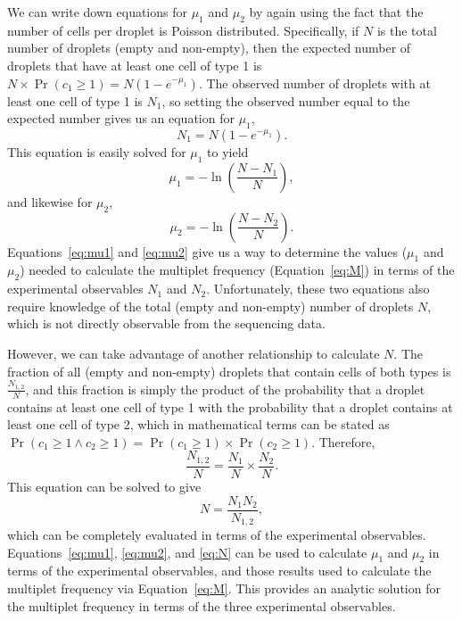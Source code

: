 \documentclass[fleqn,10pt]{wlpeerj} %
\begin{document}
We can write down equations for $\mu_1$ and $\mu_2$ by again using the fact that the number of cells per droplet is Poisson distributed.
Specifically, if $N$ is the total number of droplets (empty and non-empty), then the expected number of droplets that have at least one cell of type 1 is $N \times \Pr\left(c_1 \ge 1\right) = N \left(1 - e^{-\mu_1}\right)$.
The observed number of droplets with at least one cell of type 1 is $N_1$, so setting the observed number equal to the expected number gives us an equation for $\mu_1$,
\begin{equation}
N_1 = N \left(1 - e^{-\mu_1}\right).
\end{equation}
This equation is easily solved for $\mu_1$ to yield
\begin{equation}
\label{eq:mu1}
\mu_1 = -\ln\left(\frac{N - N_1}{N}\right),
\end{equation}
and likewise for $\mu_2$,
\begin{equation}
\label{eq:mu2}
\mu_2 = -\ln\left(\frac{N - N_2}{N}\right).
\end{equation}
Equations~\ref{eq:mu1} and \ref{eq:mu2} give us a way to determine the values ($\mu_1$ and $\mu_2$) needed to calculate the multiplet frequency (Equation~\ref{eq:M}) in terms of the experimental observables $N_1$ and $N_2$.
Unfortunately, these two equations also require knowledge of the total (empty and non-empty) number of droplets $N$, which is not directly observable from the sequencing data.

However, we can take advantage of another relationship to calculate $N$.
The fraction of all (empty and non-empty) droplets that contain cells of both types is $\frac{N_{1,2}}{N}$, and this fraction is simply the product of the probability that a droplet contains at least one cell of type 1 with the probability that a droplet contains at least one cell of type 2, which in mathematical terms can be stated as $\Pr\left(c_1 \ge 1 \land c_2 \ge 1\right) = \Pr\left(c_1 \ge 1\right) \times \Pr\left(c_2 \ge 1\right)$.
Therefore,
\begin{equation}
\frac{N_{1,2}}{N} = \frac{N_1}{N} \times \frac{N_2}{N}.
\end{equation}
This equation can be solved to give
\begin{equation}
\label{eq:N}
N = \frac{N_1 N_2}{N_{1,2}},
\end{equation}
which can be completely evaluated in terms of the experimental observables.
Equations~\ref{eq:mu1}, \ref{eq:mu2}, and \ref{eq:N} can be used to calculate $\mu_1$ and $\mu_2$ in terms of the experimental observables, and those results used to calculate the multiplet frequency via Equation~\ref{eq:M}.
This provides an analytic solution for the multiplet frequency in terms of the three experimental observables.
\end{document}
